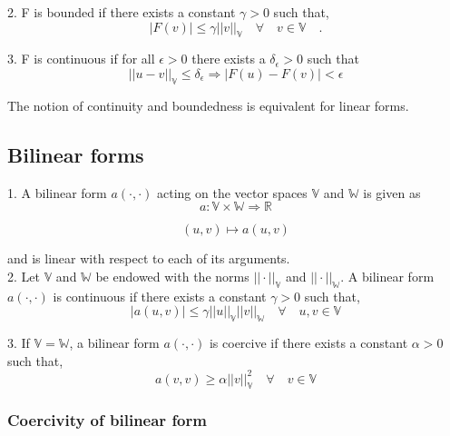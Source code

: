 \documentclass[a4paper,openany]{book}
\begin{document}
\begin{appendices}
2. F is bounded if there exists a constant $\gamma > 0$ such that,
\begin{equation} 
|F(v)| \leq \gamma ||v||_\mathbb{V} \quad \forall \quad v \in \mathbb{V} \quad \textrm{.}
\end{equation}

3. F is continuous if for all $\epsilon > 0$ there exists a $\delta_\epsilon > 0$ such that \\
\begin{equation}
||u - v||_\mathbb{V} \leq \delta_\epsilon \Rightarrow  |F(u) - F(v)| < \epsilon
\end{equation}

The notion of continuity and boundedness is equivalent for linear forms.

\subsection{Bilinear forms}

1. A bilinear form $a(\cdot,\cdot)$ acting on the vector spaces $\mathbb{V}$ and $\mathbb{W}$ is given as
\begin{equation}
a : \mathbb{V} \times \mathbb{W} \Rightarrow \mathbb{R}
\end{equation}

\begin{equation}
(u,v) \mapsto a(u,v)
\end{equation}

and is linear with respect to each of its arguments.\\

2. Let $\mathbb{V}$ and $\mathbb{W}$ be endowed with the norms $||\cdot||_\mathbb{V}$ and $||\cdot||_\mathbb{W}$. A bilinear form $a(\cdot,\cdot)$ is continuous if there exists a constant $\gamma > 0$ such that,
\begin{equation}
|a(u,v)| \leq \gamma ||u||_\mathbb{V} ||v||_\mathbb{W} \quad \forall \quad u,v \in \mathbb{V}
\end{equation}

3. If $\mathbb{V} = \mathbb{W}$, a bilinear form $a(\cdot,\cdot)$ is coercive if there exists a constant $\alpha > 0$ such that,
\begin{equation}
a(v,v) \geq \alpha ||v||_\mathbb{V}^2  \quad \forall \quad v \in  \mathbb{V}
\end{equation}

\subsubsection{Coercivity of bilinear form} \label{Coercivity_constant}


\end{appendices}
\end{document}
